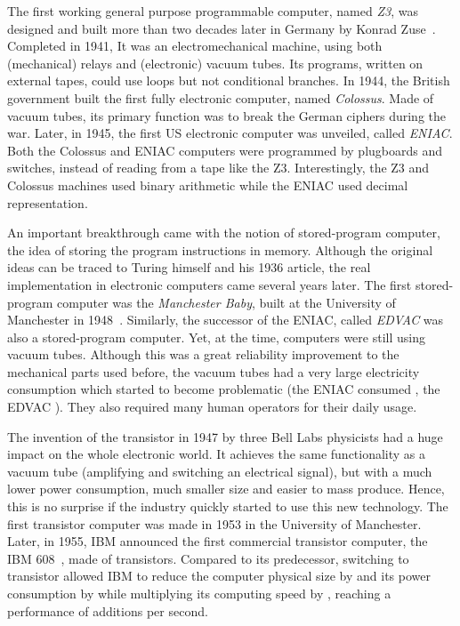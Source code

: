         The first working general purpose programmable computer, named \emph{Z3}, was designed and built more than two
        decades later in Germany by Konrad Zuse~\cite{sep-computing-history}. Completed in 1941, It was an
        electromechanical machine, using both (mechanical) relays and (electronic) vacuum tubes. Its programs, written
        on external tapes, could use loops but not conditional branches. In 1944, the British government built the first
        fully electronic computer, named \emph{Colossus}. Made of vacuum tubes, its primary function was to break the
        German ciphers during the war. Later, in 1945, the first US electronic computer was unveiled, called
        \emph{ENIAC}. Both the Colossus and ENIAC computers were programmed by plugboards and switches, instead of
        reading from a tape like the Z3. Interestingly, the Z3 and Colossus machines used binary arithmetic while the
        ENIAC used decimal representation.

        An important breakthrough came with the notion of stored-program computer, \ie the idea of storing the program
        instructions in memory. Although the original ideas can be traced to Turing himself and his 1936 article, the
        real implementation in electronic computers came several years later. The first stored-program computer was
        the \emph{Manchester Baby}, built at the University of Manchester in 1948~\cite{sep-computing-history}.
        Similarly, the successor of the ENIAC, called \emph{EDVAC} was also a stored-program computer. Yet, at the time,
        computers were still using vacuum tubes. Although this was a great reliability improvement to the mechanical
        parts used before, the vacuum tubes had a very large electricity consumption which started to become problematic
        (the ENIAC consumed , the EDVAC ). They also required many
        human operators for their daily usage.

        The invention of the transistor in 1947 by three Bell Labs physicists had a huge impact on the whole electronic
        world. It achieves the same functionality as a vacuum tube (amplifying and switching an electrical signal),
        but with a much lower power consumption, much smaller size and easier to mass produce. Hence, this is no
        surprise if the industry quickly started to use this new technology. The first transistor computer was made in
        1953 in the University of Manchester. Later, in 1955, IBM announced the first commercial transistor computer,
        the IBM 608~\cite{ibm608}, made of  transistors. Compared to its predecessor, switching to transistor
        allowed IBM to reduce the computer physical size by  and its power consumption by
         while multiplying its computing speed by , reaching a performance of 
        additions per second.

